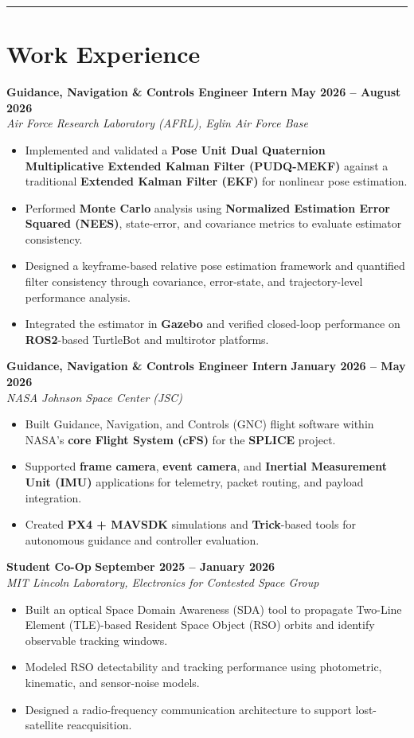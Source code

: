 \documentclass[10pt]{article}
\newcommand{\sectionline}{\noindent\rule{\linewidth}{0.4pt}}
\begin{document}
	\sectionline
	
	\section*{Work Experience}
	
	\textbf{Guidance, Navigation \& Controls Engineer Intern} \hfill \textbf{May 2026 -- August 2026} \\
	\emph{Air Force Research Laboratory (AFRL), Eglin Air Force Base}
	\begin{itemize}
		\item Implemented and validated a \textbf{Pose Unit Dual Quaternion Multiplicative Extended Kalman Filter (PUDQ-MEKF)} against a traditional \textbf{Extended Kalman Filter (EKF)} for nonlinear pose estimation.
		\item Performed \textbf{Monte Carlo} analysis using \textbf{Normalized Estimation Error Squared (NEES)}, state-error, and covariance metrics to evaluate estimator consistency.
		\item Designed a keyframe-based relative pose estimation framework and quantified filter consistency through covariance, error-state, and trajectory-level performance analysis.
		\item Integrated the estimator in \textbf{Gazebo} and verified closed-loop performance on \textbf{ROS2}-based TurtleBot and multirotor platforms.
	\end{itemize}
	
	\textbf{Guidance, Navigation \& Controls Engineer Intern} \hfill \textbf{January 2026 -- May 2026} \\
	\emph{NASA Johnson Space Center (JSC)}
	\begin{itemize}
		\item Built Guidance, Navigation, and Controls (GNC) flight software within NASA's \textbf{core Flight System (cFS)} for the \textbf{SPLICE} project.
		\item Supported \textbf{frame camera}, \textbf{event camera}, and \textbf{Inertial Measurement Unit (IMU)} applications for telemetry, packet routing, and payload integration.
		\item Created \textbf{PX4 + MAVSDK} simulations and \textbf{Trick}-based tools for autonomous guidance and controller evaluation.
	\end{itemize}
	
	\textbf{Student Co-Op} \hfill \textbf{September 2025 -- January 2026} \\
	\emph{MIT Lincoln Laboratory, Electronics for Contested Space Group}
	\begin{itemize}
		\item Built an optical Space Domain Awareness (SDA) tool to propagate Two-Line Element (TLE)-based Resident Space Object (RSO) orbits and identify observable tracking windows.
		\item Modeled RSO detectability and tracking performance using photometric, kinematic, and sensor-noise models.
		\item Designed a radio-frequency communication architecture to support lost-satellite reacquisition.
	\end{itemize}
	
\end{document}
